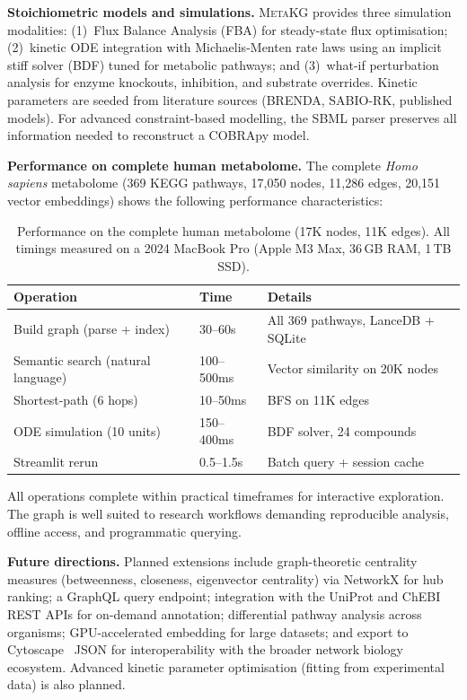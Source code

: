 \documentclass[10pt]{article}
\begin{document}
\textbf{Stoichiometric models and simulations.} \textsc{MetaKG} provides
three simulation modalities: (1)~Flux Balance Analysis (FBA) for steady-state
flux optimisation; (2)~kinetic ODE integration with Michaelis-Menten rate laws
using an implicit stiff solver (BDF) tuned for metabolic pathways; and
(3)~what-if perturbation analysis for enzyme knockouts, inhibition, and
substrate overrides. Kinetic parameters are seeded from literature sources
(BRENDA, SABIO-RK, published models). For advanced constraint-based modelling,
the SBML parser preserves all information needed to reconstruct a COBRApy
model.

\textbf{Performance on complete human metabolome.} The complete
\textit{Homo sapiens} metabolome (369 KEGG pathways, 17,050 nodes, 11,286
edges, 20,151 vector embeddings) shows the following performance
characteristics:

\begin{table}[H]
  \centering
  \caption{Performance on the complete human metabolome (17K nodes, 11K edges).
  All timings measured on a 2024 MacBook Pro (Apple M3 Max, 36\,GB RAM, 1\,TB SSD).}
  \label{tab:performance}
  \small
  \begin{tabular}{@{}lll@{}}
    \toprule
    Operation & Time & Details \\
    \midrule
    Build graph (parse + index) & 30--60s & All 369 pathways, LanceDB + SQLite \\
    Semantic search (natural language) & 100--500ms & Vector similarity on 20K nodes \\
    Shortest-path (6 hops) & 10--50ms & BFS on 11K edges \\
    ODE simulation (10 units) & 150--400ms & BDF solver, 24 compounds \\
    Streamlit rerun & 0.5--1.5s & Batch query + session cache \\
    \bottomrule
  \end{tabular}
\end{table}

All operations complete within practical timeframes for interactive
exploration. The graph is well suited to research workflows demanding
reproducible analysis, offline access, and programmatic querying.

\textbf{Future directions.} Planned extensions include graph-theoretic
centrality measures (betweenness, closeness, eigenvector centrality) via
NetworkX for hub ranking; a GraphQL query endpoint; integration with the
UniProt and ChEBI REST APIs for on-demand annotation; differential pathway
analysis across organisms; GPU-accelerated embedding for large datasets; and
export to Cytoscape~\citep{shannon2003cytoscape} JSON for interoperability
with the broader network biology ecosystem. Advanced kinetic parameter
optimisation (fitting from experimental data) is also planned.
\end{document}
